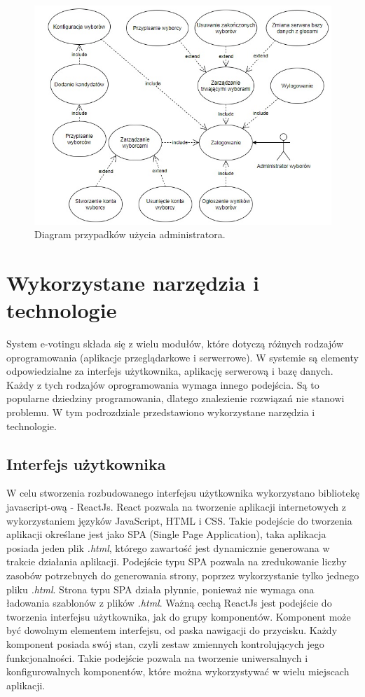 \documentclass[a4paper,12pt]{book}
\begin{document}
\begin{figure}[h]
	\centering
	\includegraphics[width=\textwidth]{images/admin_use_case.jpg}
	\caption{Diagram przypadków użycia administratora.}\label{admin-use}
\end {figure}

\section {Wykorzystane narzędzia i technologie}

System e-votingu składa się z wielu modułów, które dotyczą różnych rodzajów oprogramowania (aplikacje przeglądarkowe i serwerrowe). W systemie są elementy odpowiedzialne za interfejs użytkownika, aplikację serwerową i bazę danych. Każdy z tych rodzajów oprogramowania wymaga innego podejścia. Są to popularne dziedziny programowania, dlatego znalezienie rozwiązań nie stanowi problemu. W tym podrozdziale przedstawiono wykorzystane narzędzia i technologie.

\subsection{Interfejs użytkownika}

W celu stworzenia rozbudowanego interfejsu użytkownika wykorzystano bibliotekę javascript-ową - ReactJs. React pozwala na tworzenie aplikacji internetowych z wykorzystaniem języków JavaScript, HTML i CSS. Takie podejście do tworzenia aplikacji określane jest jako SPA (Single Page Application), taka aplikacja posiada jeden plik \textit{.html}, którego zawartość jest dynamicznie generowana w trakcie działania aplikacji. Podejście typu SPA pozwala na zredukowanie liczby zasobów potrzebnych do generowania strony, poprzez wykorzystanie tylko jednego pliku \textit{.html}. Strona typu SPA działa płynnie, ponieważ nie wymaga ona ładowania szablonów z plików \textit{.html}. Ważną cechą ReactJs jest podejście do tworzenia interfejsu użytkownika, jak do grupy komponentów. Komponent może być dowolnym elementem interfejsu, od paska nawigacji do przycisku. Każdy komponent posiada swój stan, czyli zestaw zmiennych kontrolujących jego funkcjonalności. Takie podejście pozwala na tworzenie uniwersalnych i konfigurowalnych komponentów, które można wykorzystywać w wielu miejscach aplikacji.
\end{document}
